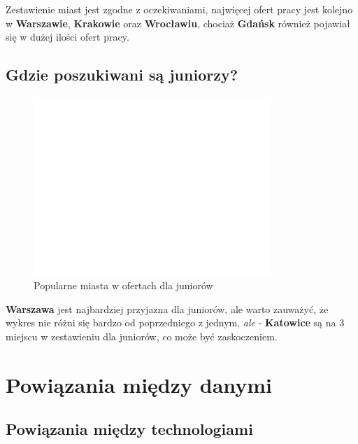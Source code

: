 \documentclass{article}
\begin{document}
\quad Zestawienie miast jest zgodne z oczekiwaniami, najwięcej ofert pracy jest kolejno w \textbf{Warszawie}, \textbf{Krakowie} oraz \textbf{Wrocławiu}, chociaż
\textbf{Gdańsk} również pojawiał się w dużej ilości ofert pracy.


\subsection{Gdzie poszukiwani są juniorzy?}

\begin{figure}[H]
    \centering
    \includegraphics[width=0.8\textwidth]{../analysis/plots/rozkłady/Popularne miasta dla Juniorów.png}
    \caption{Popularne miasta w ofertach dla juniorów}
\end{figure}

\quad \textbf{Warszawa} jest najbardziej przyjazna dla juniorów, ale
warto zauważyć, że wykres nie różni się bardzo od poprzedniego z jednym, \textit{ale} - \textbf{Katowice} są
na 3 miejscu w zestawieniu dla juniorów, co może być zaskoczeniem.


\section{Powiązania między danymi}

\subsection{Powiązania między technologiami}
\end{document}

